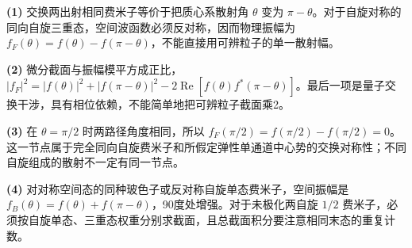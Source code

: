 \par\noindent\textbf{(1)} 交换两出射相同费米子等价于把质心系散射角 \(\theta\) 变为 \(\pi-\theta\)。对于自旋对称的同向自旋三重态，空间波函数必须反对称，因而物理振幅为 \(f_F(\theta)=f(\theta)-f(\pi-\theta)\)，不能直接用可辨粒子的单一散射幅。
\par\noindent\textbf{(2)} 微分截面与振幅模平方成正比，\(|f_F|^2=|f(\theta)|^2+|f(\pi-\theta)|^2-2\operatorname{Re}[f(\theta)f^*(\pi-\theta)]\)。最后一项是量子交换干涉，具有相位依赖，不能简单地把可辨粒子截面乘2。
\par\noindent\textbf{(3)} 在 \(\theta=\pi/2\) 时两路径角度相同，所以 \(f_F(\pi/2)=f(\pi/2)-f(\pi/2)=0\)。这一节点属于完全同向自旋费米子和所假定弹性单通道中心势的交换对称性；不同自旋组成的散射不一定有同一节点。
\par\noindent\textbf{(4)} 对对称空间态的同种玻色子或反对称自旋单态费米子，空间振幅是 \(f_B(\theta)=f(\theta)+f(\pi-\theta)\)，90度处增强。对于未极化两自旋 \(1/2\) 费米子，必须按自旋单态、三重态权重分别求截面，且总截面积分要注意相同末态的重复计数。
